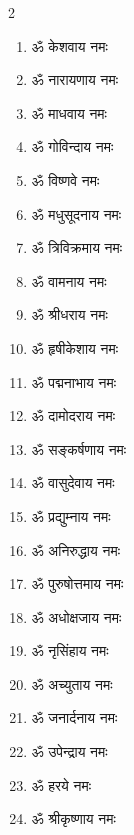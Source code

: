 \begin{multicols}{2}
\begin{enumerate}
\item ॐ केशवाय नमः
\item ॐ नारायणाय नमः
\item ॐ माधवाय नमः
\item ॐ गोविन्दाय नमः
\item ॐ विष्णवे नमः
\item ॐ मधुसूदनाय नमः
\item ॐ त्रिविक्रमाय नमः
\item ॐ वामनाय नमः
\item ॐ श्रीधराय नमः
\item ॐ हृषीकेशाय नमः
\item ॐ पद्मनाभाय नमः
\item ॐ दामोदराय नमः
\item ॐ सङ्कर्षणाय नमः
\item ॐ वासुदेवाय नमः
\item ॐ प्रद्युम्नाय नमः
\item ॐ अनिरुद्धाय नमः
\item ॐ पुरुषोत्तमाय नमः
\item ॐ अधोक्षजाय नमः
\item ॐ नृसिंहाय नमः
\item ॐ अच्युताय नमः
\item ॐ जनार्दनाय नमः
\item ॐ उपेन्द्राय नमः
\item ॐ हरये नमः
\item ॐ श्रीकृष्णाय नमः
\end{enumerate}
\end{multicols}

\begingroup
\centering
\setlength{\columnseprule}{1pt}
\let\chapt\sect


\endgroup

